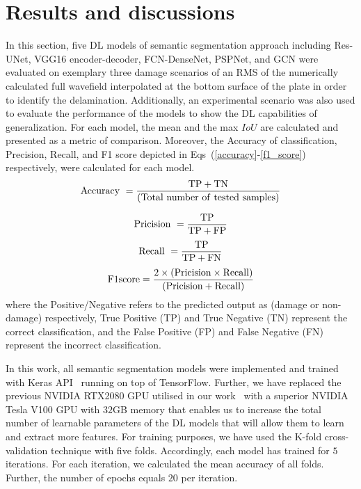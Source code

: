 \section{Results and discussions}
\label{section:results_and_discussions}
In this section, five DL models of semantic segmentation approach including  Res-UNet, VGG16 encoder-decoder, FCN-DenseNet, PSPNet, and GCN were evaluated on exemplary three damage scenarios of an RMS of the numerically calculated full wavefield interpolated at the bottom surface of the plate in order to identify the delamination.
Additionally, an experimental scenario was also used to evaluate the performance of the models to show the DL capabilities of generalization.
For each model, the mean and the max \(IoU\) are calculated and presented as a metric of comparison.
Moreover, the Accuracy of classification, Precision, Recall, and F1 score depicted in Eqs~(\ref{accuracy}-\ref{f1_score}) respectively, were calculated for each model.
\begin{equation}
	\rm Accuracy\ = \frac{TP+TN}{(Total\ number\ of\ tested\ samples)}
	\label{accuracy}
\end{equation}

\begin{equation}
	\rm Pricision\ =\frac{TP}{TP+FP}
	\label{pricisoin}
\end{equation}
\begin{equation}
	\rm Recall\ = \frac{TP}{TP+ FN}
	\label{recall}
\end{equation}
\begin{equation}
	\rm F1 score =\frac{2 \times (Pricision\times Recall)}{(Pricision + Recall)} 
	\label{f1_score}
\end{equation}
where the Positive/Negative refers to the predicted output as (damage or non-damage) respectively, True Positive (TP) and True Negative (TN)  represent the correct classification, and the False Positive (FP) and False Negative (FN) represent the incorrect classification.

In this work, all semantic segmentation models were implemented and trained with Keras API~\cite{chollet2015keras} running on top of TensorFlow.
Further, we have replaced the previous NVIDIA RTX2080 GPU utilised in our work~\cite{Ijjeh2021} with a superior NVIDIA Tesla V100 GPU with \(32\)GB memory that enables us to increase the total number of learnable parameters of the DL models that will allow them to learn and extract more features. 
For training purposes, we have used the K-fold cross-validation technique with five folds. 
Accordingly, each model has trained for \(5\) iterations. 
For each iteration, we calculated the mean accuracy of all folds.
Further, the number of epochs equals \(20\) per iteration.
